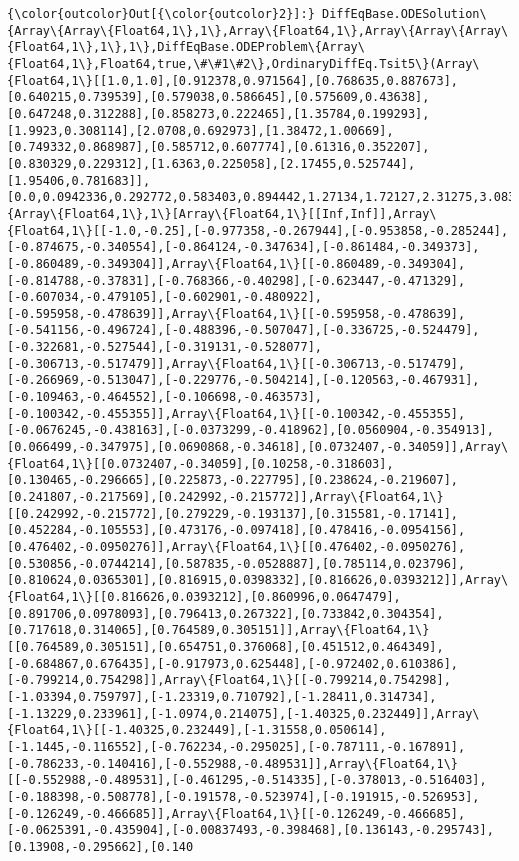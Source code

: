 \documentclass[11pt]{article}
\begin{document}
            \begin{Verbatim}[commandchars=\\\{\}]
{\color{outcolor}Out[{\color{outcolor}2}]:} DiffEqBase.ODESolution\{Array\{Array\{Float64,1\},1\},Array\{Float64,1\},Array\{Array\{Array\{Float64,1\},1\},1\},DiffEqBase.ODEProblem\{Array\{Float64,1\},Float64,true,\#\#1\#2\},OrdinaryDiffEq.Tsit5\}(Array\{Float64,1\}[[1.0,1.0],[0.912378,0.971564],[0.768635,0.887673],[0.640215,0.739539],[0.579038,0.586645],[0.575609,0.43638],[0.647248,0.312288],[0.858273,0.222465],[1.35784,0.199293],[1.9923,0.308114],[2.0708,0.692973],[1.38472,1.00669],[0.749332,0.868987],[0.585712,0.607774],[0.61316,0.352207],[0.830329,0.229312],[1.6363,0.225058],[2.17455,0.525744],[1.95406,0.781683]],[0.0,0.0942336,0.292772,0.583403,0.894442,1.27134,1.72127,2.31275,3.08354,3.81497,4.51466,5.0524,5.69616,6.21559,6.92158,7.61688,8.7721,9.6451,10.0],Array\{Array\{Float64,1\},1\}[Array\{Float64,1\}[[Inf,Inf]],Array\{Float64,1\}[[-1.0,-0.25],[-0.977358,-0.267944],[-0.953858,-0.285244],[-0.874675,-0.340554],[-0.864124,-0.347634],[-0.861484,-0.349373],[-0.860489,-0.349304]],Array\{Float64,1\}[[-0.860489,-0.349304],[-0.814788,-0.37831],[-0.768366,-0.40298],[-0.623447,-0.471329],[-0.607034,-0.479105],[-0.602901,-0.480922],[-0.595958,-0.478639]],Array\{Float64,1\}[[-0.595958,-0.478639],[-0.541156,-0.496724],[-0.488396,-0.507047],[-0.336725,-0.524479],[-0.322681,-0.527544],[-0.319131,-0.528077],[-0.306713,-0.517479]],Array\{Float64,1\}[[-0.306713,-0.517479],[-0.266969,-0.513047],[-0.229776,-0.504214],[-0.120563,-0.467931],[-0.109463,-0.464552],[-0.106698,-0.463573],[-0.100342,-0.455355]],Array\{Float64,1\}[[-0.100342,-0.455355],[-0.0676245,-0.438163],[-0.0373299,-0.418962],[0.0560904,-0.354913],[0.066499,-0.347975],[0.0690868,-0.34618],[0.0732407,-0.34059]],Array\{Float64,1\}[[0.0732407,-0.34059],[0.10258,-0.318603],[0.130465,-0.296665],[0.225873,-0.227795],[0.238624,-0.219607],[0.241807,-0.217569],[0.242992,-0.215772]],Array\{Float64,1\}[[0.242992,-0.215772],[0.279229,-0.193137],[0.315581,-0.17141],[0.452284,-0.105553],[0.473176,-0.097418],[0.478416,-0.0954156],[0.476402,-0.0950276]],Array\{Float64,1\}[[0.476402,-0.0950276],[0.530856,-0.0744214],[0.587835,-0.0528887],[0.785114,0.023796],[0.810624,0.0365301],[0.816915,0.0398332],[0.816626,0.0393212]],Array\{Float64,1\}[[0.816626,0.0393212],[0.860996,0.0647479],[0.891706,0.0978093],[0.796413,0.267322],[0.733842,0.304354],[0.717618,0.314065],[0.764589,0.305151]],Array\{Float64,1\}[[0.764589,0.305151],[0.654751,0.376068],[0.451512,0.464349],[-0.684867,0.676435],[-0.917973,0.625448],[-0.972402,0.610386],[-0.799214,0.754298]],Array\{Float64,1\}[[-0.799214,0.754298],[-1.03394,0.759797],[-1.23319,0.710792],[-1.28411,0.314734],[-1.13229,0.233961],[-1.0974,0.214075],[-1.40325,0.232449]],Array\{Float64,1\}[[-1.40325,0.232449],[-1.31558,0.050614],[-1.1445,-0.116552],[-0.762234,-0.295025],[-0.787111,-0.167891],[-0.786233,-0.140416],[-0.552988,-0.489531]],Array\{Float64,1\}[[-0.552988,-0.489531],[-0.461295,-0.514335],[-0.378013,-0.516403],[-0.188398,-0.508778],[-0.191578,-0.523974],[-0.191915,-0.526953],[-0.126249,-0.466685]],Array\{Float64,1\}[[-0.126249,-0.466685],[-0.0625391,-0.435904],[-0.00837493,-0.398468],[0.136143,-0.295743],[0.13908,-0.295662],[0.140
\end{Verbatim}
\end{document}
